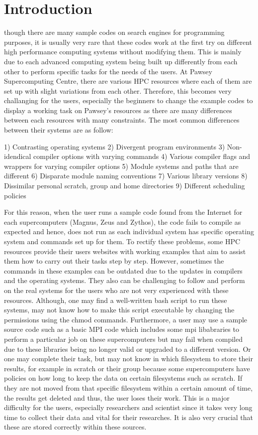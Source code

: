 \documentclass[journal]{IEEEtran}
\begin{document}
\section{Introduction}

 though there are many sample codes on search engines for programming purposes, it is usually very rare that these codes work at 
the first try on different high performance computing systems without modifying them. This is mainly due to each advanced computing system being built 
up differently from each other to perform specific tasks for the needs of the users. At Pawsey Supercomputing Centre, there are various HPC resources 
where each of them are set up with slight variations from each other. Therefore, this becomes very challanging for the users, especially the beginners 
to change the example codes to display a working task on Pawsey's resources as there are many differences between each resources with many constraints. 
The most common differences between their systems are as follow:

1) Contrasting operating systems 
2) Divergent program environments
3) Non-idendical compiler options with varying commands
4) Various compiler flags and wrappers for varying compiler options
5) Module systems and paths that are different
6) Disparate module naming conventions
7) Various library versions
8) Dissimilar personal scratch, group and home directories
9) Different scheduling policies

For this reason, when the user runs a sample code found from the Internet for each supercomputers (Magnus, Zeus and Zythos), the code fails to compile 
as expected and hence, does not run as each individual system has specific operating system and commands set up for them. To rectify these problems, 
some HPC resources provide their users websites with working examples that aim to assist them how to carry out their tasks step by step. 
However, sometimes the commands in these examples can be outdated due to the updates in compilers and the operating systems. They also can be challenging 
to follow and perform on the real systems for the users who are not very experienced with these resources. Although, one may find a well-written bash 
script to run these systems, may not know how to make this script executable by changing the permissions using the chmod commands. Furthermore, a user 
may use a sample source code such as a basic MPI code which includes some mpi libabraries to perform a particular job on these supercomputers but may 
fail when compiled due to these libraries being no longer valid or upgraded to a different version. Or one may complete their task, but may 
not know in which filesystem to store their results, for example in scratch or their group because some supercomputers have policies on how long to keep 
the data on certain filesystems such as scratch. If they are not moved from that specific filesystem within a certain amount of time, the results get 
deleted and thus, the user loses their work. This is a major difficulty for the users, especially researchers and scientist since it takes very long time 
to collect their data and vital for their researches. It is also very crucial that these are stored correctly within these sources.
\end{document}
